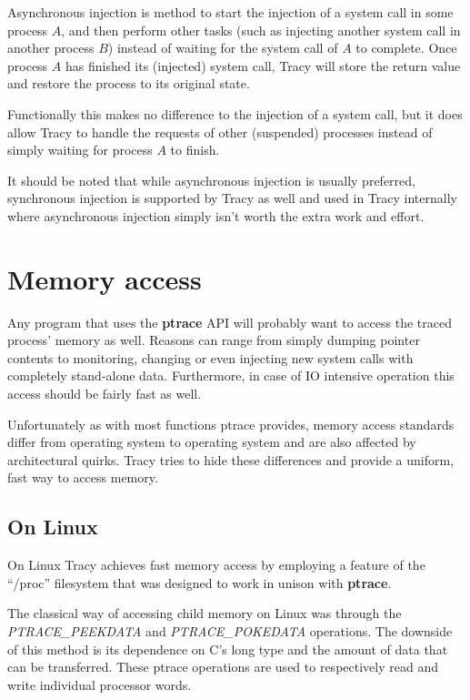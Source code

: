 \documentclass[a4paper, 10pt]{report}
\begin{document}
Asynchronous injection is method to start the injection of a system call in
some process $A$, and then perform other tasks (such as injecting another
system call in another process $B$) instead of waiting for the system call
of $A$ to complete.
Once process $A$ has finished its (injected) system call, Tracy will store
the return value and restore the process to its original state.

Functionally this makes no difference to the injection of a system call, but
it does allow Tracy to handle the requests of other (suspended) processes
instead of simply waiting for process $A$ to finish.

It should be noted that while asynchronous injection is usually preferred,
synchronous injection is supported by Tracy as well and used in Tracy
internally where asynchronous injection simply isn't worth the extra work
and effort.

\section{Memory access}


Any program that uses the \textbf{ptrace} API will probably want to access the
traced process' memory as well. Reasons can range from simply dumping pointer
contents to monitoring, changing or even injecting new system calls with
completely stand-alone data. Furthermore, in case of IO intensive operation
this access should be fairly fast as well.

Unfortunately as with most functions ptrace provides, memory access standards
differ from operating system to operating system and are also
affected by architectural quirks. Tracy tries to hide these differences and
provide a uniform, fast way to access memory.

\subsection{On Linux}
On Linux Tracy achieves fast memory access by employing a feature of the
``/proc'' filesystem that was designed to work in unison with
\textbf{ptrace}.

The classical way of accessing child memory on Linux was through the
\textit{PTRACE\_PEEKDATA} and \textit{PTRACE\_POKEDATA} operations.
The downside of this method is its dependence on C's long type and the
amount of data that can be transferred.
These ptrace operations are used to respectively read and write individual
processor words.
\end{document}
